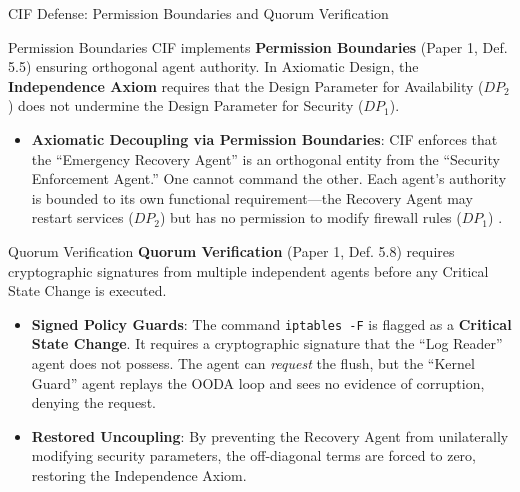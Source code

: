 \documentclass[
  ignorenonframetext,
]{beamer}
\providecommand{\tightlist}{%
  \setlength{\itemsep}{0pt}\setlength{\parskip}{0pt}}
\begin{document}
\begin{frame}{CIF Defense: Permission
Boundaries and Quorum Verification}
\protect{}\label{cif-defense-permission-boundaries-and-quorum-verification}
\begin{block}{Permission Boundaries}
\protect{}\label{permission-boundaries}
CIF implements \textbf{Permission Boundaries} (Paper 1, Def. 5.5)
\cite{friedman2026cogsec1} ensuring orthogonal agent authority. In
Axiomatic Design, the \textbf{Independence Axiom} requires that the
Design Parameter for Availability (\(DP_2\)) does not undermine the
Design Parameter for Security (\(DP_1\)).

\begin{itemize}
\tightlist
\item
  \textbf{Axiomatic Decoupling via Permission Boundaries}: CIF enforces
  that the ``Emergency Recovery Agent'' is an orthogonal entity from the
  ``Security Enforcement Agent.'' One cannot command the other. Each
  agent's authority is bounded to its own functional requirement---the
  Recovery Agent may restart services (\(DP_2\)) but has no permission
  to modify firewall rules (\(DP_1\)) \cite{friedman2026cogsec3}.
\end{itemize}
\end{block}

\begin{block}{Quorum Verification}
\protect{}\label{quorum-verification}
\textbf{Quorum Verification} (Paper 1, Def. 5.8)
\cite{friedman2026cogsec1} requires cryptographic signatures from
multiple independent agents before any Critical State Change is
executed.

\begin{itemize}
\tightlist
\item
  \textbf{Signed Policy Guards}: The command \texttt{iptables\ -F} is
  flagged as a \textbf{Critical State Change}. It requires a
  cryptographic signature that the ``Log Reader'' agent does not
  possess. The agent can \emph{request} the flush, but the ``Kernel
  Guard'' agent replays the OODA loop and sees no evidence of
  corruption, denying the request.
\item
  \textbf{Restored Uncoupling}: By preventing the Recovery Agent from
  unilaterally modifying security parameters, the off-diagonal terms are
  forced to zero, restoring the Independence Axiom.
\end{itemize}
\end{block}
\end{frame}
\end{document}
